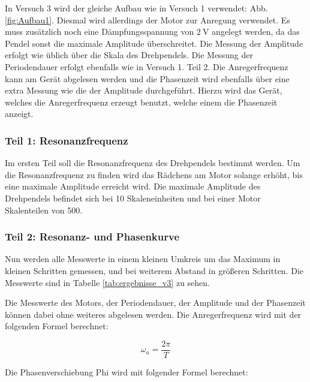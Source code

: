         In Versuch 3 wird der gleiche Aufbau wie in Versuch 1 verwendet: Abb. \ref{fig:Aufbau1}. Diesmal wird allerdings der Motor zur Anregung verwendet. Es muss zusätzlich noch eine Dämpfungsspannung von $2\ \mathrm{V}$ angelegt werden, da das Pendel sonst die maximale Amplitude überschreitet. Die Messung der Amplitude erfolgt wie üblich über die Skala des Drehpendels. Die Messung der Periodendauer erfolgt ebenfalls wie in Versuch 1. Teil 2. Die Anregerfrequenz kann am Gerät abgelesen werden und die Phasenzeit wird ebenfalls über eine extra Messung wie die der Amplitude durchgeführt. Hierzu wird das Gerät, welches die Anregerfrequenz erzeugt benutzt, welche einem die Phasenzeit anzeigt.

        \subsubsection{Teil 1: Resonanzfrequenz}
        
            Im ersten Teil soll die Resonanzfrequenz des Drehpendels bestimmt werden. Um die Resonanzfrequenz zu finden wird das Rädchens am Motor solange erhöht, bis eine maximale Amplitude erreicht wird. Die maximale Amplitude des Drehpendels befindet sich bei 10 Skaleneinheiten und bei einer Motor Skalenteilen von 500.

        \subsubsection{Teil 2: Resonanz- und Phasenkurve}
        \label{sec:3.2}
    
            Nun werden alle Messwerte in einem kleinen Umkreis um das Maximum in kleinen Schritten gemessen, und bei weiterem Abstand in größeren Schritten. Die Messwerte sind in Tabelle \ref{tab:ergebnisse_v3} zu sehen.

            Die Messwerte des Motors, der Periodendauer, der Amplitude und der Phasenzeit können dabei ohne weiteres abgelesen werden. Die Anregerfrequenz wird mit der folgenden Formel berechnet:

            \begin{equation}
                \omega_{a} = \frac{2 \pi}{T}
            \end{equation}

            Die Phasenverschiebung Phi wird mit folgender Formel berechnet:

